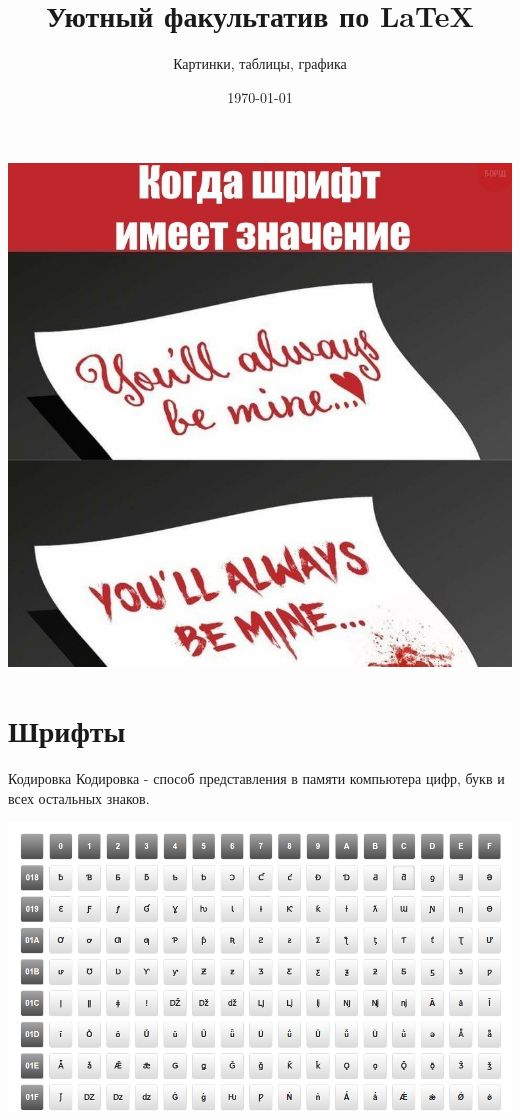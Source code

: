 \documentclass[aspectratio=169]{beamer} %
\title{Уютный факультатив по \LaTeX}
\subtitle{Картинки, таблицы, графика}
\date{\today}
\begin{document}
\begingroup
{}
\begin{frame}[plain]
\centering  \includegraphics[width=0.63\linewidth]{font.jpg}	
\end{frame}
\endgroup 

\maketitle

\section{Шрифты}  



\begin{frame}{Кодировка} 
Кодировка - способ представления в памяти компьютера цифр, букв и всех остальных знаков. 

\centering \includegraphics[width=0.68\linewidth]{codirovka.png}	
\end{frame}
\end{document}
